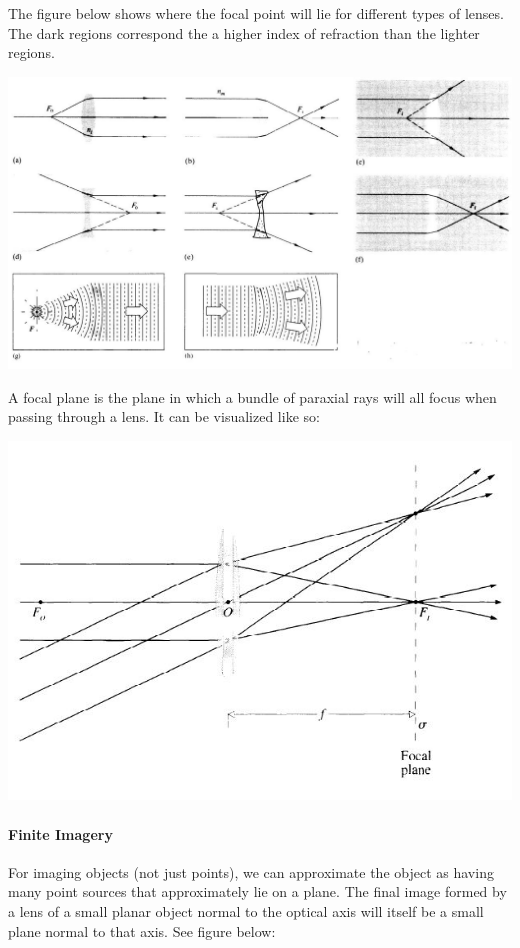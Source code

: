 \documentclass[12pt]{report}
\begin{document}
The figure below shows where the focal point will lie for different types of lenses. The dark regions correspond the a higher index of refraction than the lighter regions. 

\includegraphics[scale=.45]{FocalPoint.jpg}

A focal plane is the plane in which a bundle of paraxial rays will all focus when passing through a lens. It can be visualized like so:

\includegraphics[scale=.75]{FocalPlane1.jpg}

\paragraph{Finite Imagery}

For imaging objects (not just points), we can approximate the object as having many point sources that approximately lie on a plane. The final image formed by a lens of a small planar object normal to the optical axis will itself be a small plane normal to that axis. See figure below:
\end{document}
